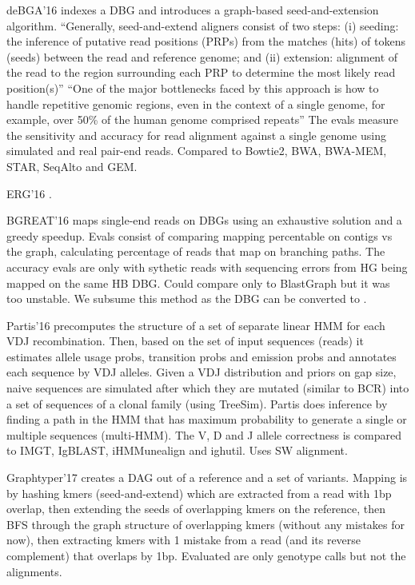 deBGA'16 \cite{liu2016debga} indexes a DBG and introduces a graph-based seed-and-extension algorithm.
``Generally, seed-and-extend aligners consist of two steps:
(i) seeding: the inference of putative read positions (PRPs) from the matches (hits) of tokens (seeds) between the read and reference genome;
and (ii) extension: alignment of the read to the region surrounding each PRP to determine the most likely read position(s)''
``One of the major bottlenecks faced by this approach is how to handle repetitive genomic regions, even in the context of a single genome,
for example, over 50\% of the human genome comprised repeats''
The evals measure the sensitivity and accuracy for read alignment against a single genome using simulated and real pair-end reads.
Compared to Bowtie2, BWA, BWA-MEM, STAR, SeqAlto and GEM.

ERG'16 \cite{vijaya2012new}.

BGREAT'16\cite{limasset2016read} maps single-end reads on DBGs using an exhaustive solution and a greedy speedup.
Evals consist of comparing mapping percentable on contigs vs the graph, calculating percentage of reads that map on branching paths.
The accuracy evals are only with sythetic reads with sequencing errors from HG being mapped on the same HB DBG.
Could compare only to BlastGraph but it was too unstable.
We subsume this method as the DBG can be converted to \tool.

Partis'16\cite{ralph2016consistency} precomputes the structure of a set of separate linear HMM for each VDJ recombination.
Then, based on the set of input sequences (\eg reads) it estimates allele usage probs, transition probs and emission probs and annotates each sequence by VDJ alleles.
Given a VDJ distribution and priors on gap size, naive sequences are simulated after which they are mutated (similar to BCR) into a set of sequences of a clonal family (using TreeSim).
Partis does inference by finding a path in the HMM that has maximum probability to generate a single or multiple sequences (multi-HMM).
The V, D and J allele correctness is compared to IMGT, IgBLAST, iHMMunealign and ighutil. Uses SW alignment.

Graphtyper'17\cite{eggertsson2017graphtyper} creates a DAG out of a reference and a set of variants.
Mapping is by hashing kmers (seed-and-extend) which are extracted from a read with 1bp overlap, then extending the seeds of overlapping kmers on the reference, then BFS through the graph structure of overlapping kmers (without any mistakes for now), then extracting kmers with 1 mistake from a read (and its reverse complement) that overlaps by 1bp. Evaluated are only genotype calls but not the alignments.

